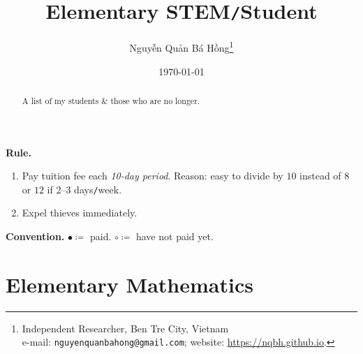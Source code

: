 \documentclass{article}
\title{Elementary STEM\texttt{/}Student}
\author{\selectlanguage{vietnamese} Nguyễn Quản Bá Hồng\footnote{Independent Researcher, Ben Tre City, Vietnam\\e-mail: \texttt{nguyenquanbahong@gmail.com}; website: \url{https://nqbh.github.io}.}}
\date{\today}
\numberwithin{equation}{section}
\begin{document}
\maketitle
{}
\begin{abstract}
	A list of my students \& those who are no longer.
\end{abstract}
\tableofcontents
\newpage


\noindent\textbf{Rule.}
\begin{enumerate}
	\item Pay tuition fee each \textit{10-day period}. Reason: easy to divide by $10$ instead of $8$ or $12$ if 2--3 days\texttt{/}week.
	\item Expel thieves immediately.
\end{enumerate}
\textbf{Convention.} $\bullet\coloneq$ paid. $\circ\coloneq$ have not paid yet. 

\section{Elementary Mathematics}
\end{document}
